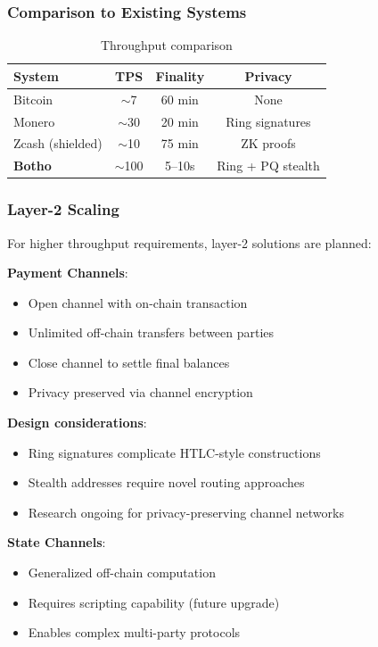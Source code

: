 \subsubsection{Comparison to Existing Systems}

\begin{table}[h]
\centering
\caption{Throughput comparison}
\label{tab:throughput-compare}
\begin{tabular}{@{}lccc@{}}
\toprule
\textbf{System} & \textbf{TPS} & \textbf{Finality} & \textbf{Privacy} \\
\midrule
Bitcoin & $\sim$7 & 60 min & None \\
Monero & $\sim$30 & 20 min & Ring signatures \\
Zcash (shielded) & $\sim$10 & 75 min & ZK proofs \\
\textbf{Botho} & $\sim$100 & 5--10s & Ring + PQ stealth \\
\bottomrule
\end{tabular}
\end{table}

\subsubsection{Layer-2 Scaling}

For higher throughput requirements, layer-2 solutions are planned:

\textbf{Payment Channels}:
\begin{itemize}
  \item Open channel with on-chain transaction
  \item Unlimited off-chain transfers between parties
  \item Close channel to settle final balances
  \item Privacy preserved via channel encryption
\end{itemize}

\textbf{Design considerations}:
\begin{itemize}
  \item Ring signatures complicate HTLC-style constructions
  \item Stealth addresses require novel routing approaches
  \item Research ongoing for privacy-preserving channel networks
\end{itemize}

\textbf{State Channels}:
\begin{itemize}
  \item Generalized off-chain computation
  \item Requires scripting capability (future upgrade)
  \item Enables complex multi-party protocols
\end{itemize}


